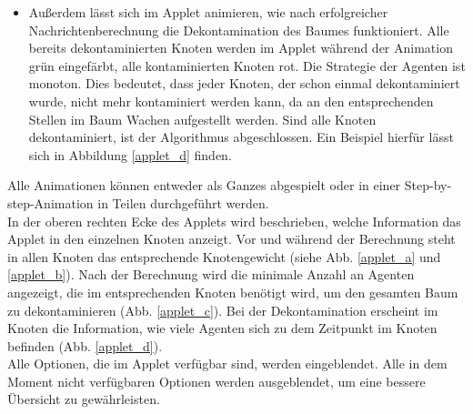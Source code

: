 \begin{itemize}
	\item Außerdem lässt sich im Applet animieren, wie nach erfolgreicher Nachrichtenberechnung die Dekontamination des Baumes funktioniert. Alle bereits dekontaminierten Knoten werden im Applet während der Animation grün eingefärbt, alle kontaminierten Knoten rot. Die Strategie der Agenten ist  monoton. Dies bedeutet, dass jeder Knoten, der schon einmal dekontaminiert wurde, nicht mehr kontaminiert werden kann, da an den entsprechenden Stellen im Baum Wachen aufgestellt werden. Sind alle Knoten dekontaminiert, ist der Algorithmus abgeschlossen. Ein Beispiel hierfür lässt sich in Abbildung \ref{applet_d} finden.
\end{itemize}

Alle Animationen können entweder als Ganzes abgespielt oder in einer Step-by-step-Animation in Teilen durchgeführt werden. \\
In der oberen rechten Ecke des Applets wird beschrieben, welche Information das Applet in den einzelnen Knoten anzeigt. Vor und während der Berechnung steht in allen Knoten das entsprechende Knotengewicht (siehe Abb. \ref{applet_a} und \ref{applet_b}). Nach der Berechnung wird die minimale Anzahl an Agenten angezeigt, die im entsprechenden Knoten benötigt wird, um den gesamten Baum zu dekontaminieren (Abb. \ref{applet_c}). Bei der Dekontamination erscheint im Knoten die Information, wie viele Agenten sich zu dem Zeitpunkt im Knoten befinden (Abb. \ref{applet_d}).\\
Alle Optionen, die im Applet verfügbar sind, werden eingeblendet. Alle in dem Moment nicht verfügbaren Optionen werden ausgeblendet, um eine bessere Übersicht zu gewährleisten.


